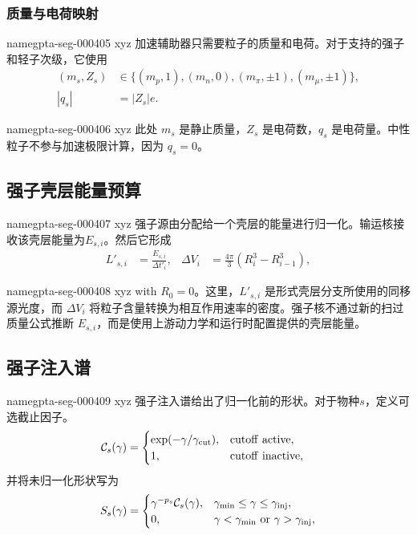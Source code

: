 \documentclass[twocolumn]{aastex702}
\makeatletter
\providecommand{\gptareaderanchor}[1]{\pdfdest name{#1} xyz}%
\providecommand{\gptareaderanchor}[1]{\special{pdf:dest (#1) [ @thispage /XYZ @xpos @ypos null ]}}%
\makeatother
\begin{document}
\subsubsection{质量与电荷映射}


\gptareaderanchor{gpta-seg-000405}%
加速辅助器只需要粒子的质量和电荷。对于支持的强子和轻子次级，它使用
\begin{equation}
\begin{aligned}
(m_s,Z_s)&\in
\{(m_p,1),(m_n,0),(m_\pi,\pm1),(m_\mu,\pm1)\},\\
|q_s|&=|Z_s|e .
\end{aligned}
\end{equation}

\gptareaderanchor{gpta-seg-000406}%
此处 \(m_s\) 是静止质量，\(Z_s\) 是电荷数，\(q_s\) 是电荷量。中性粒子不参与加速极限计算，因为 \(q_s=0\)。

\subsection{强子壳层能量预算}


\gptareaderanchor{gpta-seg-000407}%
强子源由分配给一个壳层的能量进行归一化。输运核接收该壳层能量为\(E_{s,i}\)。然后它形成
\begin{equation}
\begin{aligned}
L'_{s,i}&=\frac{E_{s,i}}{\Delta t'_i},&
\Delta V_i&=\frac{4\pi}{3}(R_i^3-R_{i-1}^3),
\end{aligned}
\end{equation}

\gptareaderanchor{gpta-seg-000408}%
with \(R_0=0\)。这里，\(L'_{s,i}\) 是形式壳层分支所使用的同移源光度，而 \(\Delta V_i\) 将粒子含量转换为相互作用速率的密度。强子核不通过新的扫过质量公式推断 \(E_{s,i}\)，而是使用上游动力学和运行时配置提供的壳层能量。

\subsection{强子注入谱}


\gptareaderanchor{gpta-seg-000409}%
强子注入谱给出了归一化前的形状。对于物种\(s\)，定义可选截止因子。
\begin{equation}
\begin{aligned}
\mathcal C_s(\gamma)&=
\begin{cases}
\exp(-\gamma/\gamma_{\rm cut}),& {\rm cutoff\ active},\\
1,& {\rm cutoff\ inactive},
\end{cases}
\end{aligned}
\end{equation}
并将未归一化形状写为
\begin{equation}
\begin{aligned}
S_s(\gamma)=
\begin{cases}
\gamma^{-p_s}\mathcal C_s(\gamma),&
\gamma_{\min}\le\gamma\le\gamma_{\rm inj},\\
0, & \gamma<\gamma_{\min}\ {\rm or}\ \gamma>\gamma_{\rm inj},
\end{cases}
\end{aligned}
\end{equation}
\end{document}
